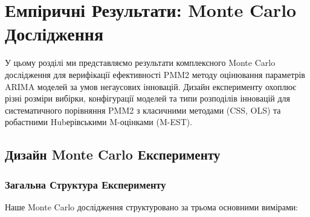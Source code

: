 \documentclass[12pt,a4paper]{article}
\begin{document}
\section{Емпіричні Результати: Monte Carlo Дослідження}
\label{sec:empirical}

У цьому розділі ми представляємо результати комплексного Monte Carlo дослідження для верифікації ефективності PMM2 методу оцінювання параметрів ARIMA моделей за умов негаусових інновацій. Дизайн експерименту охоплює різні розміри вибірки, конфігурації моделей та типи розподілів інновацій для систематичного порівняння PMM2 з класичними методами (CSS, OLS) та робастними Hubерівськими M-оцінками (M-EST).

\subsection{Дизайн Monte Carlo Експерименту}
\label{subsec:experiment_design}

\subsubsection{Загальна Структура Експерименту}

Наше Monte Carlo дослідження структуровано за трьома основними вимірами:
\end{document}
